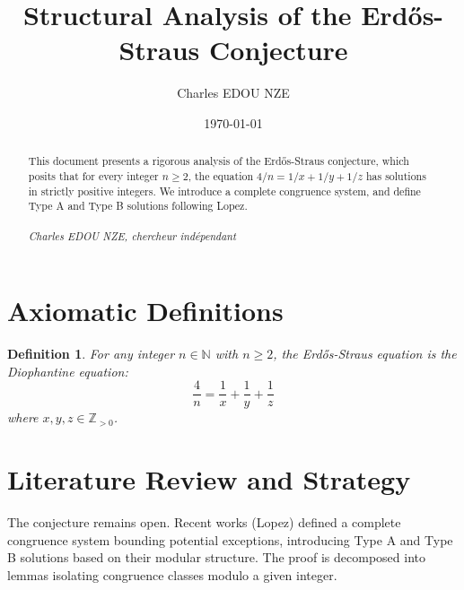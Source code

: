 \documentclass[12pt, a4paper]{article}
\title{Structural Analysis of the Erdős-Straus Conjecture}
\author{Charles EDOU NZE}
\date{\today}
\newtheorem{definition}[theorem]{Definition}
\begin{document}
\maketitle

\begin{abstract}
This document presents a rigorous analysis of the Erdős-Straus conjecture, which posits that for every integer $n \geq 2$, the equation $4/n = 1/x + 1/y + 1/z$ has solutions in strictly positive integers. We introduce a complete congruence system, and define Type A and Type B solutions following Lopez. \\ \vspace{1cm} \\ \textit{Charles EDOU NZE, chercheur indépendant}
\end{abstract}

\tableofcontents
\newpage

\section{Axiomatic Definitions}
\begin{definition}
For any integer $n \in \mathbb{N}$ with $n \geq 2$, the Erdős-Straus equation is the Diophantine equation:
\[\frac{4}{n} = \frac{1}{x} + \frac{1}{y} + \frac{1}{z}\]
where $x, y, z \in \mathbb{Z}_{>0}$.
\end{definition}

\section{Literature Review and Strategy}
The conjecture remains open. Recent works (Lopez) defined a complete congruence system bounding potential exceptions, introducing Type A and Type B solutions based on their modular structure. The proof is decomposed into lemmas isolating congruence classes modulo a given integer.
\end{document}
